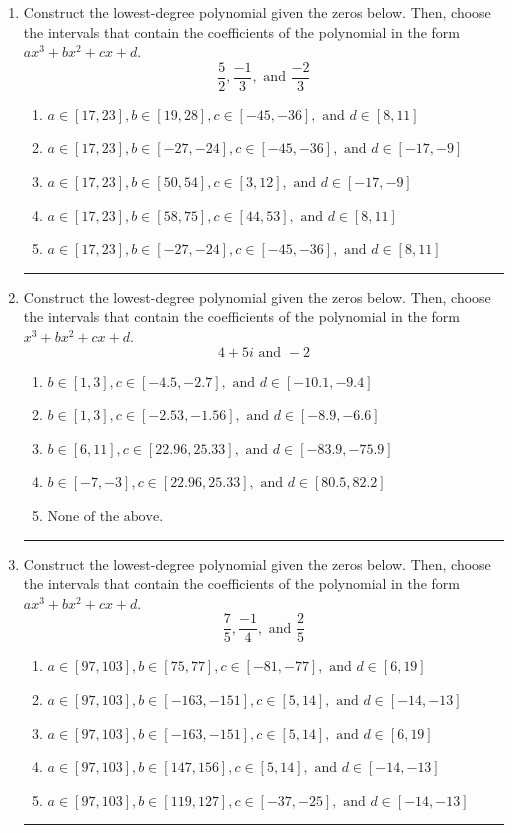 \documentclass[14pt]{extbook}
\newcommand{\litem}[1]{\item#1\hspace*{-1cm}\rule{\textwidth}{0.4pt}}
\begin{document}
\begin{enumerate}
{\begin{enumerate}[label=\Alph*.]
\end{enumerate} }
\litem{
Construct the lowest-degree polynomial given the zeros below. Then, choose the intervals that contain the coefficients of the polynomial in the form $ax^3+bx^2+cx+d$.\[ \frac{5}{2}, \frac{-1}{3}, \text{ and } \frac{-2}{3} \]\begin{enumerate}[label=\Alph*.]
\item \( a \in [17, 23], b \in [19, 28], c \in [-45, -36], \text{ and } d \in [8, 11] \)
\item \( a \in [17, 23], b \in [-27, -24], c \in [-45, -36], \text{ and } d \in [-17, -9] \)
\item \( a \in [17, 23], b \in [50, 54], c \in [3, 12], \text{ and } d \in [-17, -9] \)
\item \( a \in [17, 23], b \in [58, 75], c \in [44, 53], \text{ and } d \in [8, 11] \)
\item \( a \in [17, 23], b \in [-27, -24], c \in [-45, -36], \text{ and } d \in [8, 11] \)

\end{enumerate} }
\litem{
Construct the lowest-degree polynomial given the zeros below. Then, choose the intervals that contain the coefficients of the polynomial in the form $x^3+bx^2+cx+d$.\[ 4 + 5 i \text{ and } -2 \]\begin{enumerate}[label=\Alph*.]
\item \( b \in [1, 3], c \in [-4.5, -2.7], \text{ and } d \in [-10.1, -9.4] \)
\item \( b \in [1, 3], c \in [-2.53, -1.56], \text{ and } d \in [-8.9, -6.6] \)
\item \( b \in [6, 11], c \in [22.96, 25.33], \text{ and } d \in [-83.9, -75.9] \)
\item \( b \in [-7, -3], c \in [22.96, 25.33], \text{ and } d \in [80.5, 82.2] \)
\item \( \text{None of the above.} \)

\end{enumerate} }
\litem{
Construct the lowest-degree polynomial given the zeros below. Then, choose the intervals that contain the coefficients of the polynomial in the form $ax^3+bx^2+cx+d$.\[ \frac{7}{5}, \frac{-1}{4}, \text{ and } \frac{2}{5} \]\begin{enumerate}[label=\Alph*.]
\item \( a \in [97, 103], b \in [75, 77], c \in [-81, -77], \text{ and } d \in [6, 19] \)
\item \( a \in [97, 103], b \in [-163, -151], c \in [5, 14], \text{ and } d \in [-14, -13] \)
\item \( a \in [97, 103], b \in [-163, -151], c \in [5, 14], \text{ and } d \in [6, 19] \)
\item \( a \in [97, 103], b \in [147, 156], c \in [5, 14], \text{ and } d \in [-14, -13] \)
\item \( a \in [97, 103], b \in [119, 127], c \in [-37, -25], \text{ and } d \in [-14, -13] \)


\end{enumerate}}
\end{enumerate}
\end{document}
